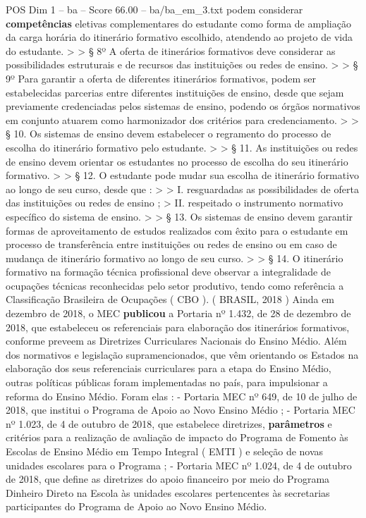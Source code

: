\begin{textsample}{POS Dim 1 – ba – Score 66.00 – ba/ba\_em\_3.txt}
podem considerar \textbf{competências} eletivas complementares do estudante como forma de ampliação da carga horária do itinerário formativo escolhido, atendendo ao projeto de vida do estudante. > > § 8º A oferta de itinerários formativos deve considerar as possibilidades estruturais e de recursos das instituições ou redes de ensino. > > § 9º Para garantir a oferta de diferentes itinerários formativos, podem ser estabelecidas parcerias entre diferentes instituições de ensino, desde que sejam previamente credenciadas pelos sistemas de ensino, podendo os órgãos normativos em conjunto atuarem como harmonizador dos critérios para credenciamento. > > § 10.
Os sistemas de ensino devem estabelecer o regramento do processo de escolha do itinerário formativo pelo estudante. > > § 11.
As instituições ou redes de ensino devem orientar os estudantes no processo de escolha do seu itinerário formativo. > > § 12.
O estudante pode mudar sua escolha de itinerário formativo ao longo de seu curso, desde que : > > I. resguardadas as possibilidades de oferta das instituições ou redes de ensino ; > II. respeitado o instrumento normativo específico do sistema de ensino. > > § 13.
Os sistemas de ensino devem garantir formas de aproveitamento de estudos realizados com êxito para o estudante em processo de transferência entre instituições ou redes de ensino ou em caso de mudança de itinerário formativo ao longo de seu curso. > > § 14.
O itinerário formativo na formação técnica profissional deve observar a integralidade de ocupações técnicas reconhecidas pelo setor produtivo, tendo como referência a Classificação Brasileira de Ocupações ( CBO ). ( BRASIL, 2018 ) Ainda em dezembro de 2018, o MEC \textbf{publicou} a Portaria nº 1.432, de 28 de dezembro de 2018, que estabeleceu os referenciais para elaboração dos itinerários formativos, conforme preveem as Diretrizes Curriculares Nacionais do Ensino Médio.
Além dos normativos e legislação supramencionados, que vêm orientando os Estados na elaboração dos seus referenciais curriculares para a etapa do Ensino Médio, outras políticas públicas foram implementadas no país, para impulsionar a reforma do Ensino Médio.
Foram elas : - Portaria MEC nº 649, de 10 de julho de 2018, que institui o Programa de Apoio ao Novo Ensino Médio ; - Portaria MEC nº 1.023, de 4 de outubro de 2018, que estabelece diretrizes, \textbf{parâmetros} e critérios para a realização de avaliação de impacto do Programa de Fomento às Escolas de Ensino Médio em Tempo Integral ( EMTI ) e seleção de novas unidades escolares para o Programa ; - Portaria MEC nº 1.024, de 4 de outubro de 2018, que define as diretrizes do apoio financeiro por meio do Programa Dinheiro Direto na Escola às unidades escolares pertencentes às secretarias participantes do Programa de Apoio ao Novo Ensino Médio.

\end{textsample}
